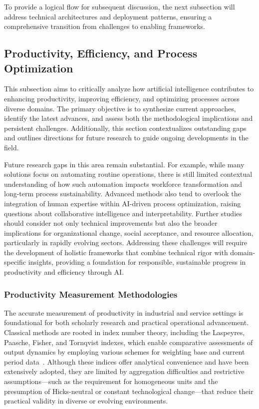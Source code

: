 \documentclass[sigconf]{acmart}
\begin{document}
To provide a logical flow for subsequent discussion, the next subsection will address technical architectures and deployment patterns, ensuring a comprehensive transition from challenges to enabling frameworks.

\subsection{Productivity, Efficiency, and Process Optimization}

This subsection aims to critically analyze how artificial intelligence contributes to enhancing productivity, improving efficiency, and optimizing processes across diverse domains. The primary objective is to synthesize current approaches, identify the latest advances, and assess both the methodological implications and persistent challenges. Additionally, this section contextualizes outstanding gaps and outlines directions for future research to guide ongoing developments in the field.

Future research gaps in this area remain substantial. For example, while many solutions focus on automating routine operations, there is still limited contextual understanding of how such automation impacts workforce transformation and long-term process sustainability. Advanced methods also tend to overlook the integration of human expertise within AI-driven process optimization, raising questions about collaborative intelligence and interpretability. Further studies should consider not only technical improvements but also the broader implications for organizational change, social acceptance, and resource allocation, particularly in rapidly evolving sectors. Addressing these challenges will require the development of holistic frameworks that combine technical rigor with domain-specific insights, providing a foundation for responsible, sustainable progress in productivity and efficiency through AI.

\subsubsection{Productivity Measurement Methodologies}

The accurate measurement of productivity in industrial and service settings is foundational for both scholarly research and practical operational advancement. Classical methods are rooted in index number theory, including the Laspeyres, Paasche, Fisher, and Tornqvist indexes, which enable comparative assessments of output dynamics by employing various schemes for weighting base and current period data~\cite{ref86}. Although these indices offer analytical convenience and have been extensively adopted, they are limited by aggregation difficulties and restrictive assumptions—such as the requirement for homogeneous units and the presumption of Hicks-neutral or constant technological change—that reduce their practical validity in diverse or evolving environments.
\end{document}
